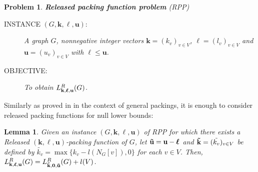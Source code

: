 \documentclass[preprint,12pt]{article}
\renewcommand{\leq}{\leqslant}
\newtheorem{lemma}[theorem]{Lemma}
\newtheorem{prblm}[theorem]{Problem}
\theoremstyle{definition}
\begin{document}
\begin{prblm}
\label{prob3}
{\noindent \textbf{Released packing function problem} (RPP)}
\begin{description}
\item [INSTANCE $(G, \mathbf{k}, \boldsymbol\ell, \mathbf{u})$:] A graph $G$,   nonnegative  integer vectors  $\mathbf{k}=(k_v)_{v\in V}$,  $\boldsymbol\ell=(l_v)_{v\in V}$ and $\mathbf{u}=(u_v)_{v\in V}$ with $\boldsymbol\ell \leq \mathbf{u}$.
\item [OBJECTIVE: ] To obtain $L^R_{\bf{\mathbf{k}},\boldsymbol\ell,\bf{\mathbf{u}}}(G)$. 
\end{description}
\end{prblm}

Similarly as proved in \cite{HNV2023} in the context of general packings, it is enough to consider released packing functions for null lower bounds:
\begin{lemma}\label{sololcero}
Given an instance $(G, \mathbf{k}, \boldsymbol\ell, \mathbf{u})$ of RPP for which there exists a  Released  $(\mathbf{k}, \boldsymbol\ell, \mathbf{u})$-packing function of $G$, let
$\bf{\tilde{\mathbf{u}}}=\mathbf{u}-\boldsymbol\ell$ and ${\bf{\tilde{\mathbf{k}}}}=(\tilde{ k_v})_{v\in V}$ be defined by $\tilde{ k_v}=\max\{k_v- l(N_G[v]),0\}$ for each $v\in V$. Then, 
$L^R_{\mathbf{k},\boldsymbol\ell,\mathbf{u}}(G)= L^R_{\bf{\tilde{\mathbf{k}}},\mathbf{0},\bf{\tilde{\mathbf{u}}}}(G)+l(V)$.

\end{lemma}
\end{document}
